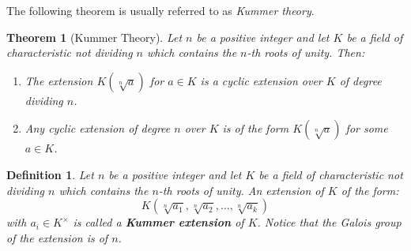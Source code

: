 \documentclass[12pt]{article}
\newtheorem{thm}{Theorem}
\newtheorem{defn}{Definition}
\begin{document}
The following theorem is usually referred to as {\it Kummer theory}. 

\begin{thm}[Kummer Theory]
Let $n$ be a positive integer and let $K$ be a field of characteristic not dividing $n$ which contains the $n$-th roots of unity. Then:
\begin{enumerate}
\item The extension $K(\sqrt[n]{a})$ for $a\in K$ is a cyclic extension over $K$ of degree dividing $n$.\\

\item Any cyclic extension of degree $n$ over $K$ is of the form $K(\sqrt[n]{a})$ for some $a\in K$.\\
\end{enumerate}
\end{thm}

\begin{defn}
Let $n$ be a positive integer and let $K$ be a field of characteristic not dividing $n$ which contains the $n$-th roots of unity. An extension of $K$ of the form:
$$K(\sqrt[n]{a_1},\sqrt[n]{a_2},\ldots,\sqrt[n]{a_k})$$
with $a_i \in K^\times$ is called a {\bf Kummer extension} of $K$. Notice that the Galois group of the extension is of  $n$.
\end{defn}
\end{document}
